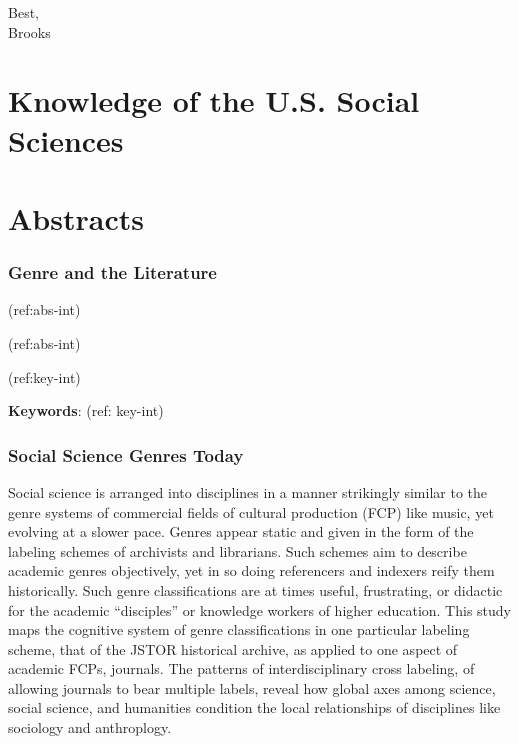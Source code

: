 \documentclass[]{book}
\theoremstyle{definition}
\theoremstyle{definition}
\theoremstyle{definition}
\theoremstyle{remark}
\begin{document}
Best,\\
Brooks

\hypertarget{knowledge-of-the-u.s.-social-sciences}{%
\chapter*{Knowledge of the U.S. Social
Sciences}\label{knowledge-of-the-u.s.-social-sciences}}


\hypertarget{abstracts}{%
\chapter*{Abstracts}\label{abstracts}}


\hypertarget{genre-and-the-literature}{%
\subsection*{Genre and the Literature}\label{genre-and-the-literature}}


(ref:abs-int)

(ref:abs-int)

(ref:key-int)

\textbf{Keywords}: (ref: key-int)

\hypertarget{social-science-genres-today}{%
\subsection*{Social Science Genres
Today}\label{social-science-genres-today}}


















Social science is arranged into disciplines in a manner
strikingly similar to the genre systems of commercial fields of cultural
production (FCP) like music, yet evolving at a slower pace. Genres
appear static and given in the form of the labeling schemes of
archivists and librarians. Such schemes aim to describe academic genres
objectively, yet in so doing referencers and indexers reify them
historically. Such genre classifications are at times useful,
frustrating, or didactic for the academic ``disciples'' or knowledge
workers of higher education. This study maps the cognitive system of
genre classifications in one particular labeling scheme, that of the
JSTOR historical archive, as applied to one aspect of academic FCPs,
journals. The patterns of interdisciplinary cross labeling, of allowing
journals to bear multiple labels, reveal how global axes among science,
social science, and humanities condition the local relationships of
disciplines like sociology and anthroplogy.
\end{document}
